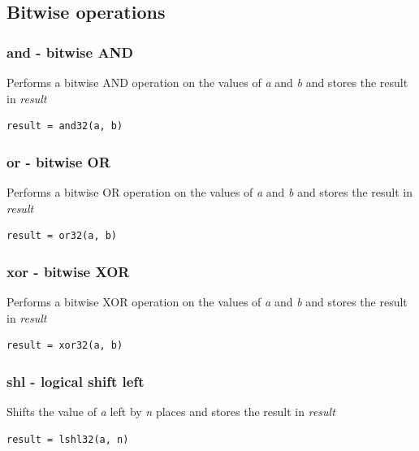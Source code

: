 \documentclass[a4paper,10pt]{article}
\begin{document}

\subsection{Bitwise operations}
\subsubsection{and - bitwise AND}
	{Performs a bitwise AND operation on the values of \emph{a} and \emph{b} and stores the result in \emph{result}}
\begin{lstlisting}
result = and32(a, b)
\end{lstlisting}

\subsubsection{or - bitwise OR}
	{Performs a bitwise OR operation on the values of \emph{a} and \emph{b} and stores the result in \emph{result}}
\begin{lstlisting}
result = or32(a, b)
\end{lstlisting}

\subsubsection{xor - bitwise XOR}
	{Performs a bitwise XOR operation on the values of \emph{a} and \emph{b} and stores the result in \emph{result}}
\begin{lstlisting}
result = xor32(a, b)
\end{lstlisting}

\subsubsection{shl - logical shift left}
	{Shifts the value of \emph{a} left by \emph{n} places and stores the result in \emph{result}}
\begin{lstlisting}
result = lshl32(a, n)
\end{lstlisting}
\end{document}
